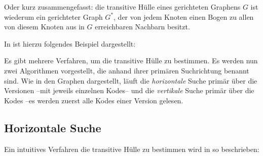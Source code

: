 Oder kurz zusammengefasst: die transitive Hülle eines gerichteten Graphens $G$ ist wiederum ein gerichteter Graph $G^*$, der von jedem Knoten einen Bogen zu allen von diesem Knoten aus in $G$ erreichbaren Nachbarn besitzt. 

In \cite[Seite 172]{gross2013handbook} ist hierzu folgendes Beispiel dargestellt:

\begin{figure}[H]
    \centering
    \setlength{\fboxsep}{10pt}\color{black!20}
    \normalcolor%
\end{figure}

Es gibt mehrere Verfahren, um die transitive Hülle zu bestimmen. Es werden nun zwei Algorithmen vorgestellt, die anhand ihrer primären Suchrichtung benannt sind. Wie in den Graphen dargestellt, läuft die \emph{horizontale} Suche primär über die Versionen --mit jeweils einzelnen Kodes-- und die \emph{vertikale} Suche primär über die Kodes --es werden zuerst alle Kodes einer Version gelesen.

\subsection{Horizontale Suche}

Ein intuitives Verfahren die transitive Hülle zu bestimmen wird in \cite[Seite 200]{jakobsson1991mixed} so beschrieben:

\begin{figure}[H]
    \centering
    \setlength{\fboxsep}{10pt}\color{black!20}
    \normalcolor%
    \vspace{-1em}
\end{figure}


